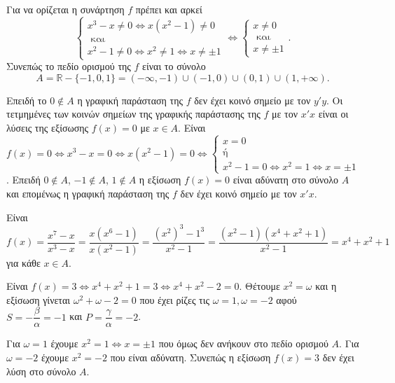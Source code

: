 
\begin{alist}
\item Για να ορίζεται η συνάρτηση $f$ πρέπει και αρκεί
\[\begin{cases} x^3 - x \ne 0 \Leftrightarrow x(x^2 - 1) \ne 0 \\ \text{ και} \\ x^2 - 1 \ne 0 \Leftrightarrow x^2 \ne 1 \Leftrightarrow x \ne \pm 1 \end{cases} \Leftrightarrow \begin{cases} x \ne 0 \\ \text{ και} \\ x \ne \pm 1 \end{cases}.\]
Συνεπώς το πεδίο ορισμού της $f$ είναι το σύνολο
\[A = \mathbb{R} - \{-1, 0, 1\} = (-\infty, -1) \cup (-1, 0) \cup (0, 1) \cup (1, +\infty).\]

\item Επειδή το $0 \notin A$ η γραφική παράσταση της $f$ δεν έχει κοινό σημείο με τον $y'y$.
Οι τετμημένες των κοινών σημείων της γραφικής παράστασης της $f$ με τον $x'x$ είναι οι λύσεις της εξίσωσης $f(x) = 0$ με $x \in A$.
Είναι $f(x) = 0 \Leftrightarrow x^3 - x = 0 \Leftrightarrow x(x^2 - 1) = 0 \Leftrightarrow \begin{cases} x = 0 \\ \text{ή} \\ x^2 - 1 = 0 \Leftrightarrow x^2 = 1 \Leftrightarrow x = \pm 1 \end{cases}$.
Επειδή $0 \notin A$, $-1 \notin A$, $1 \notin A$ η εξίσωση $f(x) = 0$ είναι αδύνατη στο σύνολο $A$ και επομένως η γραφική παράσταση της $f$ δεν έχει κοινό σημείο με τον $x'x$.

\item Είναι $f(x) = \dfrac{x^7 - x}{x^3 - x} = \dfrac{x(x^6 - 1)}{x(x^2 - 1)} = \dfrac{(x^2)^3 - 1^3}{x^2 - 1} = \dfrac{(x^2 - 1)(x^4 + x^2 + 1)}{x^2 - 1} = x^4 + x^2 + 1$ για κάθε $x \in A$.

\item Είναι $f(x) = 3 \Leftrightarrow x^4 + x^2 + 1 = 3 \Leftrightarrow x^4 + x^2 - 2 = 0$. Θέτουμε $x^2 = \omega$ και η εξίσωση γίνεται $\omega^2 + \omega - 2 = 0$ που έχει ρίζες τις $\omega = 1, \omega = -2$ αφού $S = -\dfrac{\beta}{\alpha} = -1$ και $P = \dfrac{\gamma}{\alpha} = -2$.

Για $\omega = 1$ έχουμε $x^2 = 1 \Leftrightarrow x = \pm 1$ που όμως δεν ανήκουν στο πεδίο ορισμού $A$.
Για $\omega = -2$ έχουμε $x^2 = -2$ που είναι αδύνατη.
Συνεπώς η εξίσωση $f(x) = 3$ δεν έχει λύση στο σύνολο $A$.
\end{alist}

